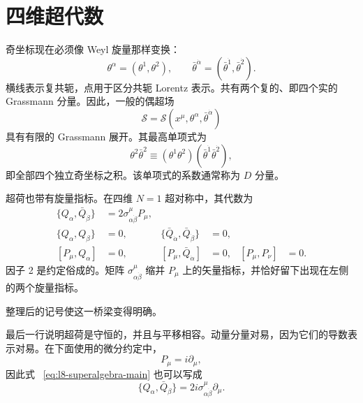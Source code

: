 \section{四维超代数}

奇坐标现在必须像 Weyl 旋量那样变换：
\begin{equation}
\theta^\alpha=(\theta^1,\theta^2),
\qquad
\bar\theta^{\dot\alpha}=(\bar\theta^{\dot1},\bar\theta^{\dot2}).
\end{equation}
横线表示复共轭，点用于区分共轭 Lorentz 表示。共有两个复的、即四个实的 Grassmann 分量。因此，一般的偶超场
\begin{equation}
\mathcal S=\mathcal S(x^\mu,\theta^\alpha,\bar\theta^{\dot\alpha})
\end{equation}
具有有限的 Grassmann 展开。其最高单项式为
\begin{equation}
\theta^2\bar\theta^2
\equiv
(\theta^1\theta^2)(\bar\theta^{\dot1}\bar\theta^{\dot2}),
\end{equation}
即全部四个独立奇坐标之积。该单项式的系数通常称为 \(D\) 分量。

超荷也带有旋量指标。在四维 \(N=1\) 超对称中，其代数为
\begin{align}
\{Q_\alpha,\bar Q_{\dot\beta}\}
&=2\sigma^\mu_{\alpha\dot\beta}P_\mu,
\label{eq:l8-superalgebra-main}\\
\{Q_\alpha,Q_\beta\}&=0,
&
\{\bar Q_{\dot\alpha},\bar Q_{\dot\beta}\}&=0,
\label{eq:l8-superalgebra-nilpotent}\\
[P_\mu,Q_\alpha]&=0,
&
[P_\mu,\bar Q_{\dot\alpha}]&=0,
&
[P_\mu,P_\nu]&=0.
\label{eq:l8-superalgebra-commutators}
\end{align}
因子 2 是约定俗成的。矩阵
\(\sigma^\mu_{\alpha\dot\beta}\)
缩并 \(P_\mu\) 上的矢量指标，并恰好留下出现在左侧的两个旋量指标。

\begin{classroomqa}
\end{classroomqa}

整理后的记号使这一桥梁变得明确。

最后一行说明超荷是守恒的，并且与平移相容。动量分量对易，因为它们的导数表示对易。在下面使用的微分约定中，
\begin{equation}
P_\mu=i\partial_\mu,
\end{equation}
因此式 ~\eqref{eq:l8-superalgebra-main} 也可以写成
\begin{equation}
\{Q_\alpha,\bar Q_{\dot\beta}\}
=2i\sigma^\mu_{\alpha\dot\beta}\partial_\mu.
\end{equation}

